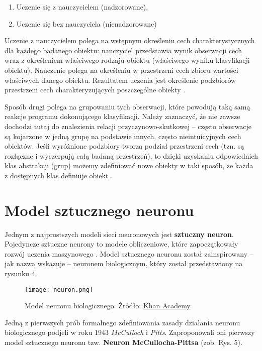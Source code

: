 \begin{enumerate}[leftmargin=2\parindent] %
    \item Uczenie się z nauczycielem (nadzorowane),
    \item Uczenie się bez nauczyciela (nienadzorowane)
\end{enumerate}

Uczenie z nauczycielem polega na wstępnym określeniu cech charakterystycznych dla każdego badanego obiektu: nauczyciel przedstawia wynik obserwacji cech wraz z określeniem właściwego rodzaju obiektu (właściwego wyniku klasyfikacji obiektu). Nauczenie polega na określeniu w przestrzeni cech zbioru wartości właściwych danego obiektu. Rezultatem uczenia jest określenie podzbiorów przestrzeni cech charakteryzujących poszczególne obiekty \citep[s. 8]{Kwiatkowski2007}.

Sposób drugi polega na grupowaniu tych obserwacji, które powodują taką samą reakcje programu dokonującego klasyfikacji. Należy zaznaczyć, że nie zawsze dochodzi tutaj do znalezienia relacji przyczynowo-skutkowej -- często obserwacje są kojarzone w jedną grupę na podstawie innych, często nieintuicyjnych cech obiektów.
Jeśli wyróżnione podzbiory tworzą podział przestrzeni cech (tzn. są rozłączne i wyczerpują całą badaną przestrzeń), to dzięki uzyskaniu odpowiednich klas abstrakcji (grup) możemy zdefiniować nowe obiekty w taki sposób, że każda z dostępnych klas definiuje obiekt \citep[s. 8-9]{Kwiatkowski2007}.

\section{Model sztucznego neuronu}
Jednym z najprostszych modeli sieci neuronowych jest \textbf{sztuczny neuron}. Pojedyncze sztuczne neurony to modele obliczeniowe, które zapoczątkowały rozwój uczenia maszynowego \citep[s. 39]{Raschka_2019}.
Model sztucznego neuronu został zainspirowany -- jak nazwa wskazuje -- neuronem biologicznym, który został przedstawiony na rysunku 4.
\begin{figure}[H]
\begin{center}
\texttt{[image: neuron.png]}
\caption{Model neuronu biologicznego. Źródło: \href{https://pl.khanacademy.org/science/biology/human-biology/neuron-nervous-system/a/overview-of-neuron-structure-and-function}{Khan Academy}}
\centering
\end{center}
\end{figure}

Jedną z pierwszych prób formalnego zdefiniowania zasady działania neuronu biologicznego podjeli w roku 1943 \textit{McCulloch} i \textit{Pitts}. Zaproponowali oni pierwszy model sztucznego neuronu tzw. \textbf{Neuron McCullocha-Pittsa} (zob. Rys. 5).

